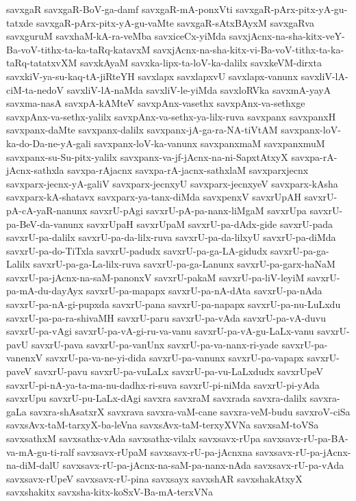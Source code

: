 {savxgaR
savxgaR-BoV-ga-damf
savxgaR-mA-ponxVti
savxgaR-pArx-pitx-yA-gu-tatxde
savxgaR-pArx-pitx-yA-gu-vaMte
savxgaR-sAtxBAyxM
savxgaRva
savxguruM
savxhaM-kA-ra-veMba
savxiceCx-yiMda
savxjAcnx-na-sha-kitx-veY-Ba-voV-tithx-ta-ka-taRq-katavxM
savxjAcnx-na-sha-kitx-vi-Ba-voV-tithx-ta-ka-taRq-tatatxvXM
savxkAyaM
savxka-lipx-ta-loV-ka-dalilx
savxkeVM-dirxta
savxkiV-ya-su-kaq-tA-jiRteYH
savxlapx
savxlapxvU
savxlapx-vanunx
savxliV-lA-ciM-ta-nedoV
savxliV-lA-naMda
savxliV-le-yiMda
savxloRVka
savxmA-yayA
savxma-nasA
savxpA-kAMteV
savxpAnx-vasethx
savxpAnx-va-sethxge
savxpAnx-va-sethx-yalilx
savxpAnx-va-sethx-ya-lilx-ruva
savxpanx
savxpanxH
savxpanx-daMte
savxpanx-dalilx
savxpanx-jA-ga-ra-NA-tiVtAM
savxpanx-loV-ka-do-Da-ne-yA-gali
savxpanx-loV-ka-vanunx
savxpanxmaM
savxpanxmuM
savxpanx-su-Su-pitx-yalilx
savxpanx-va-jf-jAcnx-na-ni-SapxtAtxyX
savxpa-rA-jAcnx-sathxla
savxpa-rAjacnx
savxpa-rA-jacnx-sathxlaM
savxparxjecnx
savxparx-jecnx-yA-galiV
savxparx-jecnxyU
savxparx-jecnxyeV
savxparx-kAsha
savxparx-kA-shatavx
savxparx-ya-tanx-diMda
savxpenxV
savxrUpAH
savxrU-pA-cA-yaR-nanunx
savxrU-pAgi
savxrU-pA-pa-nanx-liMgaM
savxrUpa
savxrU-pa-BeV-da-vanunx
savxrUpaH
savxrUpaM
savxrU-pa-dAdx-gide
savxrU-pada
savxrU-pa-dalilx
savxrU-pa-da-lilx-ruva
savxrU-pa-da-lilxyU
savxrU-pa-diMda
savxrU-pa-do-TiTxla
savxrU-padudx
savxrU-pa-ga-LA-gidudx
savxrU-pa-ga-Lalilx
savxrU-pa-ga-La-lilx-ruva
savxrU-pa-ga-Lanunx
savxrU-pa-garx-haNaM
savxrU-pa-jAcnx-na-saM-panonxV
savxrU-pakaM
savxrU-pa-liV-leyiM
savxrU-pa-mA-du-dayAyx
savxrU-pa-mapapx
savxrU-pa-nA-dAta
savxrU-pa-nAda
savxrU-pa-nA-gi-pupxda
savxrU-pana
savxrU-pa-napapx
savxrU-pa-nu-LuLxdu
savxrU-pa-pa-ra-shivaMH
savxrU-paru
savxrU-pa-vAda
savxrU-pa-vA-duvu
savxrU-pa-vAgi
savxrU-pa-vA-gi-ru-va-vanu
savxrU-pa-vA-gu-LaLx-vanu
savxrU-pavU
savxrU-pava
savxrU-pa-vanUnx
savxrU-pa-va-nanx-ri-yade
savxrU-pa-vanenxV
savxrU-pa-va-ne-yi-dida
savxrU-pa-vanunx
savxrU-pa-vapapx
savxrU-paveV
savxrU-pavu
savxrU-pa-vuLaLx
savxrU-pa-vu-LaLxdudx
savxrUpeV
savxrU-pi-nA-ya-ta-ma-nu-dadhx-ri-suva
savxrU-pi-niMda
savxrU-pi-yAda
savxrUpu
savxrU-pu-LaLx-dAgi
savxra
savxraM
savxrada
savxra-dalilx
savxra-gaLa
savxra-shAsatxrX
savxrava
savxra-vaM-cane
savxra-veM-budu
savxroV-ciSa
savxsAvx-taM-tarxyX-ba-leVna
savxsAvx-taM-terxyXVNa
savxsaM-toVSa
savxsathxM
savxsathx-vAda
savxsathx-vilalx
savxsavx-rUpa
savxsavx-rU-pa-BA-va-mA-gu-ti-ralf
savxsavx-rUpaM
savxsavx-rU-pa-jAcnxna
savxsavx-rU-pa-jAcnx-na-diM-dalU
savxsavx-rU-pa-jAcnx-na-saM-pa-nanx-nAda
savxsavx-rU-pa-vAda
savxsavx-rUpeV
savxsavx-rU-pina
savxsayx
savxshAR
savxshakAtxyX
savxshakitx
savxsha-kitx-koSxV-Ba-mA-terxVNa
}
